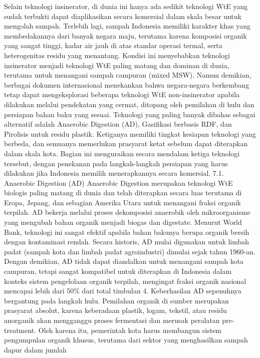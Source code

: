 \documentclass[
  letterpaper,
  DIV=11,
  numbers=noendperiod]{scrreprt}
\begin{document}
Selain teknologi insinerator, di dunia ini hanya ada sedikit teknologi
WtE yang sudah terbukti dapat diaplikasikan secara komersial dalam skala
besar untuk mengolah sampah. Terlebih lagi, sampah Indonesia memiliki
karakter khas yang membedakannya dari banyak negara maju, terutama
karena komposisi organik yang sangat tinggi, kadar air jauh di atas
standar operasi termal, serta heterogenitas residu yang menantang.
Kondisi ini menyebabkan teknologi insinerator menjadi teknologi WtE
paling matang dan dominan di dunia, terutama untuk menangani sampah
campuran (mixed MSW). Namun demikian, berbagai dokumen internasional
menekankan bahwa negara-negara berkembang tetap dapat mengeksplorasi
beberapa teknologi WtE non-insinerator apabila dilakukan melalui
pendekatan yang cermat, ditopang oleh pemilahan di hulu dan persiapan
bahan baku yang sesuai. Teknologi yang paling banyak dibahas sebagai
alternatif adalah Anaerobic Digestion (AD), Gasifikasi berbasis RDF, dan
Pirolisis untuk residu plastik. Ketiganya memiliki tingkat kesiapan
teknologi yang berbeda, dan semuanya memerlukan prasyarat ketat sebelum
dapat diterapkan dalam skala kota. Bagian ini menguraikan secara
mendalam ketiga teknologi tersebut, dengan penekanan pada
langkah-langkah persiapan yang harus dilakukan jika Indonesia memilih
menerapkannya secara komersial. 7.1. Anaerobic Digestion (AD) Anaerobic
Digestion merupakan teknologi WtE biologis paling matang di dunia dan
telah diterapkan secara luas terutama di Eropa, Jepang, dan sebagian
Amerika Utara untuk menangani fraksi organik terpilah. AD bekerja
melalui proses dekomposisi anaerobik oleh mikroorganisme yang mengubah
bahan organik menjadi biogas dan digestate. Menurut World Bank,
teknologi ini sangat efektif apabila bahan bakunya berupa organik bersih
dengan kontaminasi rendah. Secara historis, AD mulai digunakan untuk
limbah padat (sampah kota dan limbah padat agroindustri) dimulai sejak
tahun 1960-an. Dengan demikian, AD tidak dapat diandalkan untuk
menangani sampah kota campuran, tetapi sangat kompatibel untuk
diterapkan di Indonesia dalam konteks sistem pengelolaan organik
terpilah, mengingat fraksi organik nasional mencapai lebih dari 50\%
dari total timbulan 4. Keberhasilan AD sepenuhnya bergantung pada
langkah hulu. Pemilahan organik di sumber merupakan prasyarat absolut,
karena keberadaan plastik, logam, tekstil, atau residu anorganik akan
mengganggu proses fermentasi dan merusak peralatan pre-treatment. Oleh
karena itu, pemerintah kota harus membangun sistem pengumpulan organik
khusus, terutama dari sektor yang menghasilkan sampah dapur dalam jumlah
\end{document}
